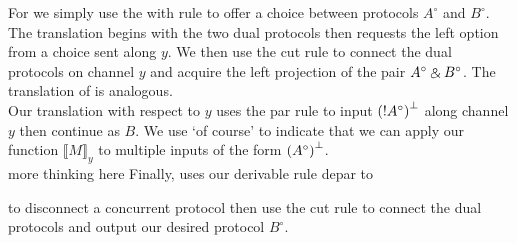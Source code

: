 \noindent
For  we simply use the with rule to offer a choice between protocols $A^\circ$ 
and $B^\circ$. \\

\noindent
The translation  begins with the two dual protocols then requests the left 
option from a choice sent along $y$. We then use the cut rule to connect the dual protocols on 
channel $y$ and acquire the left projection of the pair $A^\circ \mathbin{\binampersand} B^\circ$. The translation 
of  is analogous. \\

\noindent
Our translation  with respect to $y$ uses the par rule to input $\negg{(\ofc A^\circ)}$ 
along channel $y$ then continue as $B$. We use `of course' to indicate that we can apply our function 
$\llbracket M \rrbracket_y$ to multiple inputs of the form $\negg{(A^\circ)}$. \\

\noindent
more thinking here
Finally,  uses our derivable rule depar to 

to disconnect a concurrent protocol then 
use the cut rule to connect the dual protocols and output our desired protocol $B^\circ$.

